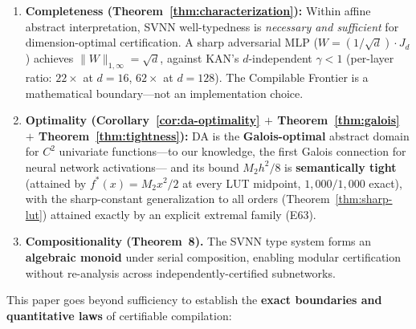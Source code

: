 \documentclass[journal,onecolumn]{IEEEtran}
\begin{document}
\begin{enumerate}[label=(\roman*)]
    \item \textbf{Completeness (Theorem~\ref{thm:characterization}):}
    Within affine abstract interpretation, SVNN well-typedness is
    \textit{necessary and sufficient} for dimension-optimal certification.
    A sharp adversarial MLP ($W = (1/\sqrt{d}) \cdot J_d$) achieves
    $\|W\|_{1,\infty} = \sqrt{d}$, against KAN's $d$-independent
    $\gamma < 1$ (per-layer ratio: $22\times$ at $d{=}16$, $62\times$ at
    $d{=}128$). The Compilable Frontier is a mathematical boundary---not
    an implementation choice.

    \item \textbf{Optimality (Corollary~\ref{cor:da-optimality}
    $+$ Theorem~\ref{thm:galois} $+$ Theorem~\ref{thm:tightness}):}
    DA is the \textbf{Galois-optimal} abstract domain for $C^2$ univariate
    functions---to our knowledge, the first Galois connection for neural
    network activations---
    and its bound $M_2 h^2 / 8$ is \textbf{semantically tight} (attained
    by $f^*(x) = M_2 x^2 / 2$ at every LUT midpoint, $1{,}000/1{,}000$
    exact), with the sharp-constant generalization to all orders
    (Theorem~\ref{thm:sharp-lut}) attained exactly by an explicit
    extremal family (E63).

    \item \textbf{Compositionality (Theorem~8).}
    The SVNN type system forms an \textbf{algebraic monoid} under
    serial composition, enabling modular certification without
    re-analysis across independently-certified subnetworks.
\end{enumerate}

This paper goes beyond sufficiency to establish the \textbf{exact
boundaries and quantitative laws} of certifiable compilation:
\end{document}
